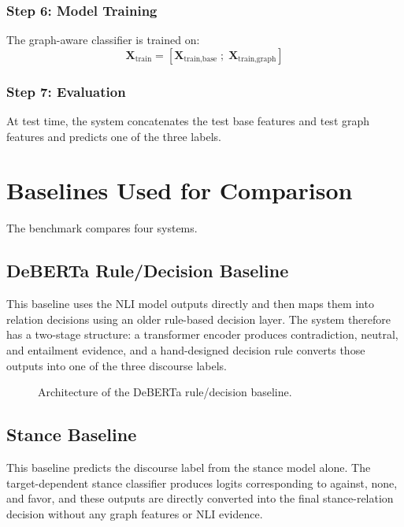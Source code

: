 \documentclass[11pt,a4paper]{article}
\begin{document}
\subsubsection{Step 6: Model Training}
The graph-aware classifier is trained on:
\[
\mathbf{X}_{\text{train}} =
\left[
\mathbf{X}_{\text{train,base}} \; ; \; \mathbf{X}_{\text{train,graph}}
\right]
\]

\subsubsection{Step 7: Evaluation}
At test time, the system concatenates the test base features and test graph features and predicts one of the three labels.

\section{Baselines Used for Comparison}
The benchmark compares four systems.

\subsection{ DeBERTa Rule/Decision Baseline}
This baseline uses the NLI model outputs directly and then maps them into relation decisions using an older rule-based decision layer. The system therefore has a two-stage structure: a transformer encoder produces contradiction, neutral, and entailment evidence, and a hand-designed decision rule converts those outputs into one of the three discourse labels.

\begin{figure}[htbp]
\centering
{}
\caption{Architecture of the  DeBERTa rule/decision baseline.}
\end{figure}

\subsection{ Stance Baseline}
This baseline predicts the discourse label from the stance model alone. The target-dependent stance classifier produces logits corresponding to against, none, and favor, and these outputs are directly converted into the final stance-relation decision without any graph features or NLI evidence.
\end{document}

